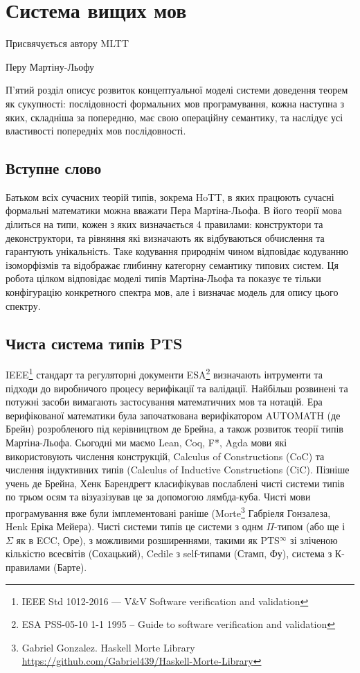 
\chapter{Система вищих мов}
\epigraph{Присвячується автору MLTT}{Перу Мартіну-Льофу}

П'ятий розділ описує розвиток концептуальної моделі системи доведення теорем як сукупності:
послідовності формальних мов програмування, кожна наступна з яких, складніша за попередню,
має свою операційну семантику, та наслідує усі властивості попередніх мов послідовності.

\section*{Вступне слово}
Батьком всіх сучасних теорій типів, зокрема HoTT, в яких працюють сучасні формальні
математики можна вважати Пера Мартіна-Льофа. В його теорії мова ділиться на типи,
кожен з яких визначається 4 правилами: конструктори та деконструктори,
та рівняння які визначають як відбуваються обчислення та гарантують унікальність.
Таке кодування природнім чином відповідає кодуванню ізоморфізмів та відображає
глибинну категорну семантику типових систем. Ця робота цілком відповідає
моделі типів Мартіна-Льофа та показує те тільки конфігурацію конкретного спектра мов,
але і визначає модель для опису цього спектру.

\section{Чиста система типів PTS}
IEEE\footnote{IEEE Std 1012-2016  --- V\&V Software verification and validation} стандарт
та регуляторні документи ESA\footnote{ESA PSS-05-10 1-1 1995 -- Guide to software verification and validation}
визначають інтрументи та підходи до виробничого процесу верифікації та валідації.
Найбільш розвинені та потужні засоби вимагають застосування математичних мов та нотацій.
Ера верифікованої математики була започаткована верифікатором AUTOMATH\cite{deBruijn83} (де Брейн) розробленого
під керівництвом де Брейна, а також розвиток теорії типів Мартіна-Льофа\cite{Lof84}.
Сьогодні ми маємо Lean, Coq, F*, Agda мови які використовують числення
конструкцій, Calculus of Constructions\cite{Coq88} (CoC)
та числення індуктивних типів (Calculus of Inductive Constructions\cite{Pfenning89} (CiC).
Пізніше учень де Брейна, Хенк Барендрегт класифікував послаблені чисті
системи типів по трьом осям та візуазізував це за допомогою лямбда-куба\cite{Henk93}.
Чисті мови програмування вже були імплементовані раніше
(Morte\footnote{Gabriel Gonzalez. Haskell Morte Library \url{https://github.com/Gabriel439/Haskell-Morte-Library}} Габріеля Гонзалеза, Henk\cite{Erik97} Еріка Мейера).
Чисті системи типів це системи з однм $\Pi$-типом (або ще і $\Sigma$ як в ECC\cite{Ore92}, Оре),
з можливими розширеннями, такими як PTS$^\infty$ зі зліченою кількістю всесвітів\cite{Tonpa18} (Сохацький),
Cedile з self-типами\cite{Fu14}\cite{Stump17} (Стамп, Фу), система з К-правилами\cite{Barthe95} (Барте).

